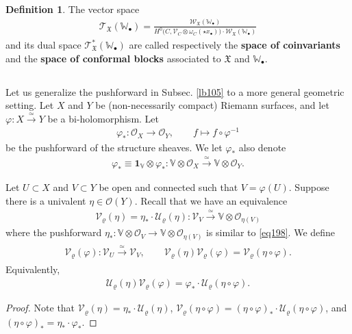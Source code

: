 \documentclass[12pt,a4paper,notitlepage]{article}
\theoremstyle{definition}
\newtheorem{df}{Definition}[section]
\theoremstyle{plain}
\newcommand{\fk}{\mathfrak}
\newcommand{\mc}{\mathcal}
\newcommand{\id}{\mathbf{1}}
\newcommand{\scr}{\mathscr}
\newcommand{\blt}{\bullet}
\newcommand{\Vbb}{\mathbb V}
\newcommand{\Wbb}{\mathbb W}
\numberwithin{equation}{section}
\begin{document}
\begin{df}
The vector space \index{T@$\scr T_{\fk X}(\Wbb_\blt),\scr T_{\fk X}^*(\Wbb_\blt)$}
\begin{align}
\scr T_{\fk X}(\Wbb_\blt)=\frac{\scr W_{\fk X}(\Wbb_\blt)}{H^0\big(C,\scr V_C\otimes\omega_C(\star x_\blt)\big)\cdot\scr W_{\fk X}(\Wbb_\blt)}
\end{align}
and its dual space $\scr T^*_{\fk X}(\Wbb_\blt)$ are called respectively  the \textbf{space of coinvariants} and the \textbf{space of conformal blocks} associated to $\fk X$ and $\Wbb_\blt$.
\end{df}



\subsection{}\label{lb128}


Let us generalize the pushforward in Subsec. \ref{lb105} to a more general geometric setting. Let $X$ and $Y$ be (non-necessarily compact)  Riemann surfaces, and let $\varphi:X\xrightarrow{\simeq}Y$ be a bi-holomorphism. Let
\begin{align}
\varphi_*:\scr O_X\rightarrow\scr O_Y,\qquad f\mapsto f\circ\varphi^{-1}
\end{align}
be the pushforward of the structure sheaves. We let $\varphi_*$ also denote
\begin{align}
\varphi_*\equiv\id_\Vbb\otimes\varphi_*:\Vbb\otimes\scr O_X\xrightarrow{\simeq}\Vbb\otimes\scr O_Y.\label{eq198}
\end{align}

Let $U\subset X$ and $V\subset Y$ be open and connected such that $V=\varphi(U)$. Suppose there is a univalent $\eta\in\scr O(Y)$. Recall that we have an equivalence
\begin{align}
\mc V_\varrho(\eta)=\eta_*\cdot\mc U_\varrho(\eta):\scr V_V\xrightarrow{\simeq}\Vbb\otimes\scr O_{\eta(V)}\label{eq201}
\end{align}
where the pushforward $\eta_*:\Vbb\otimes\scr O_V\rightarrow\Vbb\otimes\scr O_{\eta(V)}$ is similar to \eqref{eq198}. We define \index{V@$\mc V_\varrho(\eta_i),\mc V_\varrho(\varphi)$}
\begin{gather}\label{eq200}
\begin{gathered}
\mc V_\varrho(\varphi):\scr V_U\xrightarrow{\simeq}\scr V_V,\qquad \mc V_\varrho(\eta)\mc V_\varrho(\varphi)=\mc V_\varrho(\eta\circ\varphi).
\end{gathered}
\end{gather}
Equivalently,
\begin{align}
\mc U_\varrho(\eta)\mc V_\varrho(\varphi)=\varphi_*\cdot \mc U_\varrho(\eta\circ\varphi).\label{eq199}
\end{align}
\begin{proof}
Note that $\mc V_\varrho(\eta)=\eta_*\cdot \mc U_\varrho(\eta)$, $\mc V_\varrho(\eta\circ\varphi)=(\eta\circ\varphi)_*\cdot\mc U_\varrho(\eta\circ\varphi)$, and $(\eta\circ\varphi)_*=\eta_*\cdot \varphi_*$.
\end{proof}
\end{document}
